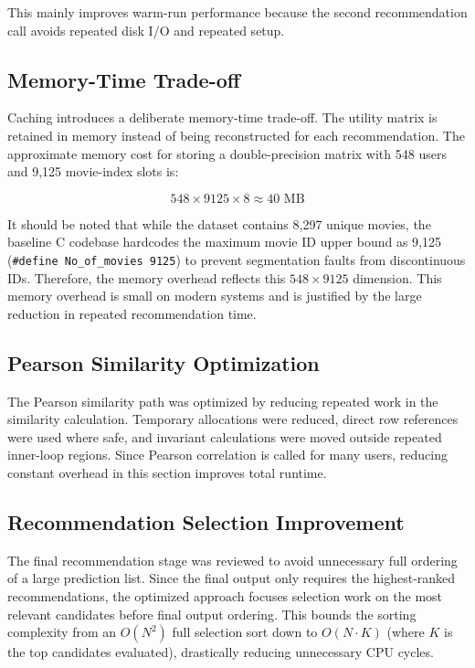 \documentclass[11pt]{article}
\begin{document}
This mainly improves warm-run performance because the second recommendation call avoids repeated disk I/O and repeated setup.

\subsection{Memory-Time Trade-off}

Caching introduces a deliberate memory-time trade-off. The utility matrix is retained in memory instead of being reconstructed for each recommendation. The approximate memory cost for storing a double-precision matrix with 548 users and 9,125 movie-index slots is:

\[
548 \times 9125 \times 8 \approx 40 \text{ MB}
\]

It should be noted that while the dataset contains 8,297 unique movies, the baseline C codebase hardcodes the maximum movie ID upper bound as 9,125 (\texttt{\#define No\_of\_movies 9125}) to prevent segmentation faults from discontinuous IDs. Therefore, the memory overhead reflects this $548 \times 9125$ dimension. This memory overhead is small on modern systems and is justified by the large reduction in repeated recommendation time.

\subsection{Pearson Similarity Optimization}

The Pearson similarity path was optimized by reducing repeated work in the similarity calculation. Temporary allocations were reduced, direct row references were used where safe, and invariant calculations were moved outside repeated inner-loop regions. Since Pearson correlation is called for many users, reducing constant overhead in this section improves total runtime.

\subsection{Recommendation Selection Improvement}

The final recommendation stage was reviewed to avoid unnecessary full ordering of a large prediction list. Since the final output only requires the highest-ranked recommendations, the optimized approach focuses selection work on the most relevant candidates before final output ordering. This bounds the sorting complexity from an $O(N^2)$ full selection sort down to $O(N \cdot K)$ (where $K$ is the top candidates evaluated), drastically reducing unnecessary CPU cycles.
\end{document}
